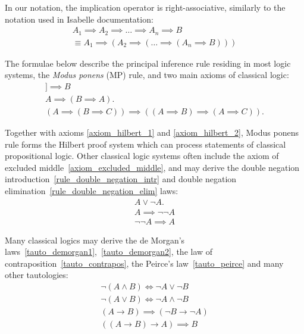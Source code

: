 \documentclass[article]{aaltoseries}
\begin{document}
In our notation, the implication operator is right-associative, similarly to the notation used in Isabelle documentation:
\begin{gather}
A_{1} \implies A_{2} \implies \dots \implies A_{n} \implies B \\
\equiv A_{1} \implies ( A_{2} \implies ( \dots \implies ( A_{n} \implies B)))
\end{gather}


The formulae below describe the principal inference rule residing in most logic systems, the \textit{Modus ponens} (MP) rule, and two main axioms of classical logic:
\begin{gather}
[\![ A, A \implies B ]\!] \implies B
    \label{rule_modus_ponens}\tag{MP} \\
%
A \implies (B \implies A).
	\label{axiom_hilbert_1}\tag{A1} \\
%
(A \implies (B \implies C)) \implies ((A \implies B) \implies (A \implies C)).
	\label{axiom_hilbert_2}\tag{A2}
\end{gather}

Together with axioms \eqref{axiom_hilbert_1} and \eqref{axiom_hilbert_2}, Modus ponens rule forms the Hilbert proof system which can process statements of classical propositional logic.
Other classical logic systems often include the axiom of excluded middle~\eqref{axiom_excluded_middle}, and may derive the double negation introduction~\eqref{rule_double_negation_intr} and double negation elimination~\eqref{rule_double_negation_elim} laws:
\begin{gather}
A \lor \neg A.
	\label{axiom_excluded_middle}\tag{EM} \\
%
A \implies \neg \neg A
\label{rule_double_negation_intr}\tag{DNi} \\
%
\neg \neg A \implies A
\label{rule_double_negation_elim}\tag{DNe}
\end{gather}

Many classical logics may derive the de Morgan's laws~\eqref{tauto_demorgan1},~\eqref{tauto_demorgan2}, the law of contraposition~\eqref{tauto_contrapos}, the Peirce's law~\eqref{tauto_peirce} and many other tautologies:
\begin{gather}
\neg (A \land B) \Longleftrightarrow \neg A \lor \neg B 
    \label{tauto_demorgan1}\tag{DM1} \\
\neg (A \lor B) \Longleftrightarrow \neg A \land \neg B 
    \label{tauto_demorgan2}\tag{DM2} \\
(A \rightarrow B) \implies (\neg B \rightarrow \neg A) 
    \label{tauto_contrapos}\tag{CP} \\
((A \rightarrow B) \rightarrow A) \implies B
    \label{tauto_peirce}\tag{PL}
\end{gather}
\end{document}
